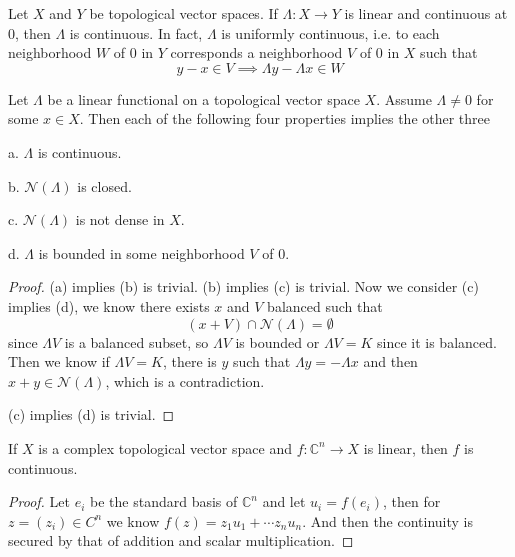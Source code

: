\documentclass[lang=en, color=blue, ]{elegantbook}
\newcommand{\C}{\mathbb{C}}
\begin{document}
\begin{theorem}
    Let $X$ and $Y$ be topological vector spaces. If $\Lambda:X\to Y$ is linear and continuous at $0$, then $\Lambda$ is continuous. In fact, $\Lambda$ is uniformly continuous, i.e. to each neighborhood $W$ of $0$ in $Y$ corresponds a neighborhood $V$ of $0$ in $X$ such that
    \[y-x \in V \implies \Lambda y - \Lambda x \in W\]
\end{theorem}

\begin{theorem}
    Let $\Lambda$ be a linear functional on a topological vector space $X$. Assume $\Lambda \neq 0$ for some $x\in X$. Then each of the following four properties implies the other three\par
    a. $\Lambda$ is continuous.\par
    b. $\mathcal{N}(\Lambda)$ is closed.\par
    c. $\mathcal{N}(\Lambda)$ is not dense in $X$.\par
    d. $\Lambda$ is bounded in some neighborhood $V$ of $0$.
\end{theorem}
\begin{proof}
    (a) implies (b) is trivial. (b) implies (c) is trivial. Now we consider (c) implies (d), we know there exists $x$ and $V$ balanced such that
    \[(x+V)\cap \mathcal{N}(\Lambda) = \emptyset\]
    since $\Lambda V$ is a balanced subset, so $\Lambda V$ is bounded or $\Lambda V = K$ since it is balanced. Then we know if $\Lambda V = K$, there is $y$ such that $\Lambda y = -\Lambda x$ and then $x+y \in \mathcal{N}(\Lambda)$, which is a contradiction.\par
    (c) implies (d) is trivial.
\end{proof}

\begin{lemma}
    If $X$ is a complex topological vector space and $f:\C^n \to X$ is linear, then $f$ is continuous.
\end{lemma}
\begin{proof}
    Let $e_i$ be the standard basis of $\C^n$ and let $u_i = f(e_i)$, then for $z= (z_i) \in C^n$ we know $f(z) = z_1u_1 + \cdots z_nu_n$. And then the continuity is secured by that of addition and scalar multiplication.
\end{proof}
\end{document}

